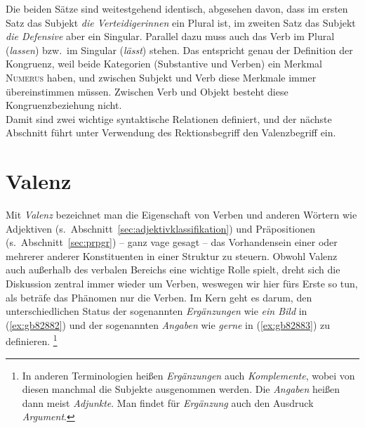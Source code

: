 \begin{exe}
\end{exe}

Die beiden Sätze sind weitestgehend identisch, abgesehen davon, dass im ersten Satz das Subjekt \textit{die Verteidigerinnen} ein Plural ist, im zweiten Satz das Subjekt \textit{die Defensive} aber ein Singular.
Parallel dazu muss auch das Verb im Plural (\textit{lassen}) bzw.\ im Singular (\textit{lässt}) stehen.
Das entspricht genau der Definition der Kongruenz, weil beide Kategorien (Substantive und Verben) ein Merkmal \textsc{Numerus} haben, und zwischen Subjekt und Verb diese Merkmale immer übereinstimmen müssen.
Zwischen Verb und Objekt besteht diese Kongruenzbeziehung nicht.\\
Damit sind zwei wichtige syntaktische Relationen definiert, und der nächste Abschnitt führt unter Verwendung des Rektionsbegriff den Valenzbegriff ein.

\section{Valenz}

\label{sec:valenz}


Mit \textit{Valenz} bezeichnet man die Eigenschaft von Verben und anderen Wörtern wie Adjektiven (s.\ Abschnitt~\ref{sec:adjektivklassifikation}) und Präpositionen (s.\ Abschnitt~\ref{sec:prpgr}) -- ganz vage gesagt -- das Vorhandensein einer oder mehrerer anderer Konstituenten in einer Struktur zu steuern.
Obwohl Valenz auch außerhalb des verbalen Bereichs eine wichtige Rolle spielt, dreht sich die Diskussion zentral immer wieder um Verben, weswegen wir hier fürs Erste so tun, als beträfe das Phänomen nur die Verben.
Im Kern geht es darum, den unterschiedlichen Status der sogenannten \textit{Ergänzungen} wie \textit{ein Bild} in (\ref{ex:gb82882}) und der sogenannten \textit{Angaben} wie \textit{gerne} in (\ref{ex:gb82883}) zu definieren.%
\footnote{In anderen Terminologien heißen \textit{Ergänzungen} auch \textit{Komplemente}, wobei von diesen manchmal die Subjekte ausgenommen werden.
Die \textit{Angaben} heißen dann meist \textit{Adjunkte}.
Man findet für \textit{Ergänzung} auch den Ausdruck \textit{Argument}.
}

\begin{exe}
  \ex\label{ex:gb82882u3}
  \begin{xlist}
  \end{xlist}
\end{exe}

